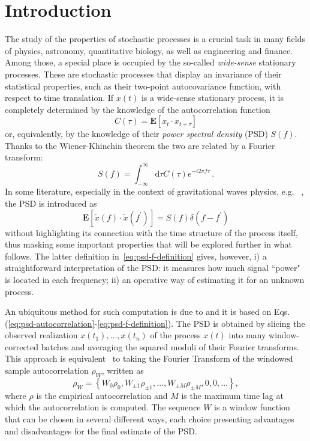 \documentclass{aa}
\begin{document}
\section{Introduction}

The study of the properties of stochastic processes is a crucial task in many fields of physics, astronomy, quantitative biology, as well as engineering and finance. Among those, a special place is occupied by the so-called \textit{wide-sense} stationary processes. These are stochastic processes that display an invariance of their statistical properties, such as their two-point autocovariance function, with respect to time translation. If $x(t)$ is a wide-sense stationary process, it is completely determined by the knowledge of the autocorrelation function 
\begin{equation}
	C(\tau) = \mathbf{E}[x_t \cdot x_{t+\tau}]
\end{equation}
or, equivalently, by the knowledge of their \emph{power spectral density} (PSD) $S(f)$. Thanks to the Wiener-Khinchin theorem the two are related by a Fourier transform: 
\begin{equation}\label{eq:psd-autocorrelation}
	S(f) = \int_{-\infty}^{\infty} \textrm{d}\tau C(\tau) e^{-i 2 \pi f \tau}\,.
\end{equation}
In some literature, especially in the context of gravitational waves physics, e.g. ~\cite{Finn_1992}, the PSD is introduced as  
\begin{equation}\label{eq:psd-f-definition}
	\mathbf{E}[\tilde{x}(f) \cdot \tilde{x}(f^\prime)] = S(f) \delta(f-f^\prime)
\end{equation}
without highlighting its connection with the time structure of the process itself, thus masking some important properties that will be explored further in what follows. The latter definition in~\eqref{eq:psd-f-definition} gives, however, i) a straightforward interpretation of the PSD: it measures how much signal ``power" is located in each frequency; ii) an operative way of estimating it for an unknown process.  

An ubiquitous method for such computation is due to \citet{Welch1967} and it is based on Eqs.(\ref{eq:psd-autocorrelation}-\ref{eq:psd-f-definition}).
The PSD is obtained by slicing the observed realization $x(t_1),\ldots,x(t_n)$ of the process $x(t)$ into many window-corrected batches and averaging the squared moduli of their Fourier transforms.
This approach is equivalent~\citep{Lomb,Scargle} to taking the Fourier Transform of the windowed sample autocorrelation $\rho_W$, written as
\begin{equation}
    \rho_{W} = \left\{W_0\rho_0,W_{\pm 1}\rho_{\pm 1}, \dots, W_{\pm M}\rho_{\pm M}, 0, 0, \dots \right\},
\end{equation}
where $\rho$ is the empirical autocorrelation and $M$ is the maximum time lag at which the autocorrelation is computed.
The sequence $W$ is a window function that can be chosen in several different ways, each choice presenting advantages and disadvantages for the final estimate of the PSD.
\end{document}
